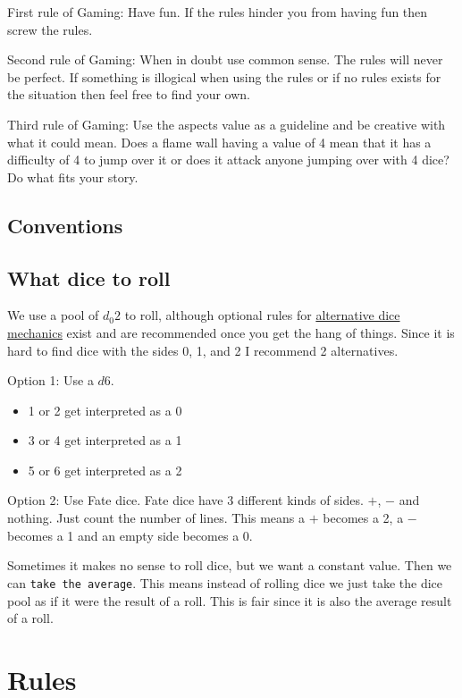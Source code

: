 \documentclass[11pt]{article}
\begin{document}
{First rule of Gaming: Have fun. If the rules hinder you from having fun then screw the rules.

Second rule of Gaming: When in doubt use common sense. The rules will never be perfect. If something is illogical when using the rules or if no rules exists for the situation then feel free to find your own. 

Third rule of Gaming: Use the aspects value as a guideline and be creative with what it could mean. Does a flame wall having a value of 4 mean that it has a difficulty of 4 to jump over it or does it attack anyone jumping over with 4 dice? Do what fits your story. 


\subsection{Conventions}
\label{sec:org1f6740d}

\subsection{What dice to roll}
\label{sec:org6a0cbf7}
We use a pool of \(d_0 2\) to roll, although optional rules for \hyperref[sec:org13782c5]{alternative dice mechanics} exist and are recommended once you get the hang of things. Since it is hard to find dice with the sides 0, 1, and 2 I recommend 2 alternatives.

Option 1: Use a \(d6\).
\begin{itemize}
\item 1 or 2 get interpreted as a 0
\item 3 or 4 get interpreted as a 1
\item 5 or 6 get interpreted as a 2
\end{itemize}

Option 2: Use Fate dice. Fate dice have 3 different kinds of sides. \(+\), \(-\) and nothing. Just count the number of lines. This means a \(+\) becomes a 2, a \(-\) becomes a 1 and an empty side becomes a \(0\).

Sometimes it makes no sense to roll dice, but we want a constant value. Then we can \texttt{take the average}. This means instead of rolling dice we just take the dice pool as if it were the result of a roll. This is fair since it is also the average result of a roll.



\newpage
\section{Rules}
\label{sec:org1eb1f1d}

}
\end{document}

